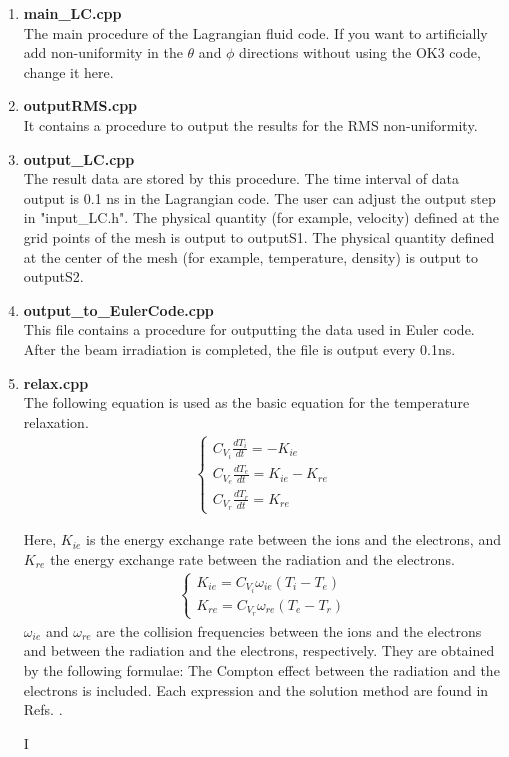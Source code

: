 \begin{enumerate}
\item {\bf main\_LC.cpp}\\
The main procedure of the Lagrangian fluid code. If you want to artificially add non-uniformity in the $\theta$ and $\phi$ directions without using the OK3 code, change it here. 
\item {\bf outputRMS.cpp}\\
It contains a procedure to output the results for the RMS non-uniformity.
\item {\bf output\_LC.cpp}\\
The result data are stored by this procedure. The time interval of data output is 0.1 ns in the Lagrangian code. The user can adjust the output step in "input\_LC.h". The physical quantity (for example, velocity) defined at the grid points of the mesh is output to outputS1. The physical quantity defined at the center of the mesh (for example, temperature, density) is output to outputS2. 
\item {\bf output\_to\_EulerCode.cpp}\\
This file contains a procedure for outputting the data used in Euler code. After the beam irradiation is completed, the file is output every 0.1ns. 
\item {\bf relax.cpp}\\
The following equation is used as the basic equation for the temperature relaxation\cite{Tahir}. 
	\begin{eqnarray}
		\begin{cases}
			C_{V_i}\frac{dT_i}{dt}=-K_{ie}\\
			C_{V_e}\frac{dT_e}{dt}=K_{ie}-K_{re}\\
			C_{V_r}\frac{dT_r}{dt}=K_{re}
		\end{cases}
	\end{eqnarray}

Here, $K_{ie}$ is the energy exchange rate between the ions and the electrons,  and $K_{re}$ the energy exchange rate between the radiation and the electrons.
\begin{eqnarray}
	\begin{cases}
		K_{ie}=C_{V_i}\omega_{ie}(T_i-T_e)\\
		K_{re}=C_{V_r}\omega_{re}(T_e-T_r)
	\end{cases}
	\end{eqnarray}
	$ \omega_{ie}$ and $ \omega_{re} $ are the collision frequencies between the ions and the electrons and between the radiation and the electrons, respectively. They are obtained by the following formulae: The Compton effect  between the radiation and the electrons is included. Each expression and the solution method are found in Refs. \cite{Tahir, CPC-O-SUKI}. 

I%

\end{enumerate}
%
